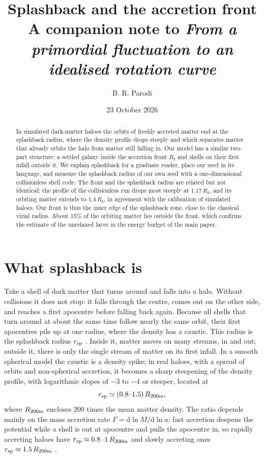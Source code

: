 \documentclass[11pt,a4paper]{article}
\title{Splashback and the accretion front\\[4pt]
\large A companion note to \emph{From a primordial fluctuation to an idealised rotation curve}}
\author{B. R. Parodi}
\date{23 October 2026}
\newcommand{\dd}{\mathrm{d}}
\newcommand{\Rb}{R_b}
\newcommand{\rsp}{r_{\rm sp}}
\begin{document}
\maketitle

\begin{abstract}
In simulated dark-matter haloes the orbits of freshly accreted matter
end at the splashback radius, where the density profile drops steeply
and which separates matter that already orbits the halo from matter
still falling in. Our model has a similar two-part structure: a settled
galaxy inside the accretion front $\Rb$ and shells on their first infall
outside it. We explain splashback for a graduate reader, place our seed
in its language, and measure the splashback radius of our own seed with
a one-dimensional collisionless shell code. The front and the splashback
radius are related but not identical: the profile of the collisionless
run drops most steeply at $1.17\,\Rb$, and its orbiting matter extends
to $1.4\,\Rb$, in agreement with the calibration of simulated haloes. Our
front is thus the inner edge of the splashback zone, close to the
classical virial radius. About 15\% of the orbiting matter lies outside
the front, which confirms the estimate of the unrelaxed layer in the
energy budget of the main paper.
\end{abstract}

\section{What splashback is}

Take a shell of dark matter that turns around and falls into a halo.
Without collisions it does not stop: it falls through the centre, comes
out on the other side, and reaches a first apocentre before falling back
again. Because all shells that turn around at about the same time follow
nearly the same orbit, their first apocentres pile up at one radius,
where the density has a caustic. This radius is the splashback radius
$\rsp$ \citep{Diemer2014,Adhikari2014,More2015}. Inside it, matter moves
on many streams, in and out; outside it, there is only the single stream
of matter on its first infall. In a smooth spherical model the caustic
is a density spike; in real haloes, with a spread of orbits and
non-spherical accretion, it becomes a sharp steepening of the density
profile, with logarithmic slopes of $-3$ to $-4$ or steeper, located at
\begin{equation}
  \rsp\simeq(0.8\text{--}1.5)\,R_{\rm 200m},
\end{equation}
where $R_{\rm 200m}$ encloses 200 times the mean matter density. The
ratio depends mainly on the mass accretion rate
$\Gamma=\dd\ln M/\dd\ln a$: fast accretion deepens the potential while a
shell is out at apocentre and pulls the apocentre in, so rapidly
accreting haloes have $\rsp\approx0.8$--$1\,R_{\rm 200m}$ and slowly
accreting ones $\rsp\approx1.5\,R_{\rm 200m}$ \citep{More2015}.
\end{document}
